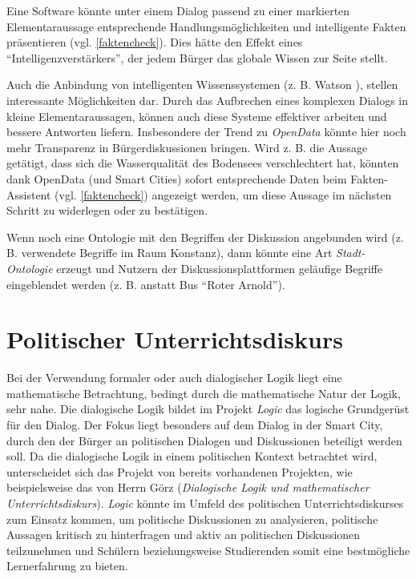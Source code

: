 \documentclass[11pt,a4paper,bibtotocnumbered]{scrreprt}
\begin{document}
Eine Software könnte unter einem Dialog passend zu einer markierten Elementaraussage entsprechende Handlungsmöglichkeiten und intelligente Fakten präsentieren (vgl. \autoref{faktencheck}).
Dies hätte den Effekt eines \enquote{Intelligenzverstärkers}, der jedem Bürger das globale Wissen zur Seite stellt.

Auch die Anbindung von intelligenten Wissenssystemen (z. B. Watson \cite{Watson}), stellen interessante Möglichkeiten dar.
Durch das Aufbrechen eines komplexen Dialogs in kleine Elementaraussagen, können auch diese Systeme effektiver arbeiten und bessere Antworten liefern.
Insbesondere der Trend zu \emph{OpenData} könnte hier noch mehr Transparenz in Bürgerdiskussionen bringen.
Wird z. B. die Aussage getätigt, dass sich die Wasserqualität des Bodensees verschlechtert hat, könnten dank OpenData (und Smart Cities) sofort entsprechende Daten beim Fakten-Assistent (vgl. \autoref{faktencheck}) angezeigt werden, um diese Aussage im nächsten Schritt zu widerlegen oder zu bestätigen.

Wenn noch eine Ontologie mit den Begriffen der Diskussion angebunden wird (z. B. verwendete Begriffe im Raum Konstanz), dann könnte eine Art \emph{Stadt-Ontologie} erzeugt und Nutzern der Diskussionsplattformen geläufige Begriffe eingeblendet werden (z. B. anstatt Bus \enquote{Roter Arnold}).


\section{Politischer Unterrichtsdiskurs} %
Bei der Verwendung formaler oder auch dialogischer Logik liegt eine mathematische Betrachtung, bedingt durch die mathematische Natur der Logik, sehr nahe. 
Die dialogische Logik bildet im Projekt \emph{Logic} das logische Grundgerüst für den Dialog. Der Fokus liegt besonders auf dem Dialog in der Smart City, durch den der Bürger an politischen Dialogen und Diskussionen beteiligt werden soll.
Da die dialogische Logik in einem politischen Kontext betrachtet wird, unterscheidet sich das Projekt von bereits vorhandenen Projekten, wie beispielsweise das von Herrn Görz (\emph{Dialogische Logik und mathematischer Unterrichtsdiskurs})\cite{GoerzUnterrichtsdiskurs}.
\emph{Logic} könnte im Umfeld des politischen Unterrichtsdiskurses zum Einsatz kommen, um politische Diskussionen zu analysieren, politische Aussagen kritisch zu hinterfragen und aktiv an politischen Diskussionen teilzunehmen und Schülern beziehungsweise Studierenden somit eine bestmögliche Lernerfahrung zu bieten.
\end{document}
